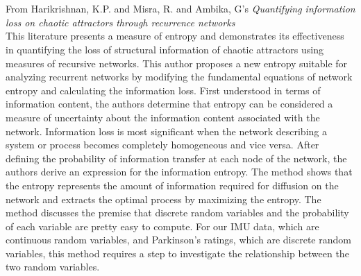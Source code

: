 \\ \hspace*{\fill} \\
From Harikrishnan, K.P. and Misra, R. and Ambika, G's \emph{Quantifying information loss on chaotic attractors through recurrence networks} \cite{2019} \\
This literature presents a measure of entropy and demonstrates its effectiveness in quantifying the loss of structural information of chaotic attractors using measures of recursive networks. This author proposes a new entropy suitable for analyzing recurrent networks by modifying the fundamental equations of network entropy and calculating the information loss. First understood in terms of information content, the authors determine that entropy can be considered a measure of uncertainty about the information content associated with the network. Information loss is most significant when the network describing a system or process becomes completely homogeneous and vice versa. After defining the probability of information transfer at each node of the network, the authors derive an expression for the information entropy. The method shows that the entropy represents the amount of information required for diffusion on the network and extracts the optimal process by maximizing the entropy. The method discusses the premise that discrete random variables and the probability of each variable are pretty easy to compute. For our IMU data, which are continuous random variables, and Parkinson's ratings, which are discrete random variables, this method requires a step to investigate the relationship between the two random variables.



